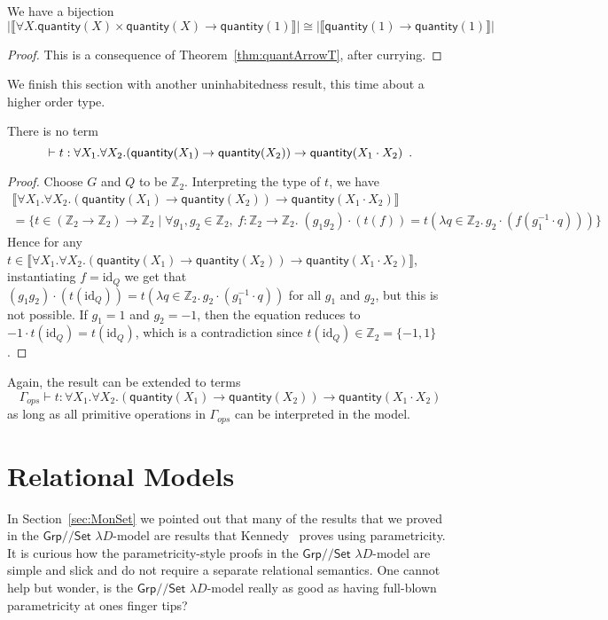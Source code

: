 \documentclass[a4paper,UKenglish]{lipics}
\theoremstyle{plain}
\newcommand{\msf}[1]{\mathsf{#1}} %
\newcommand{\Grp}{\msf{Grp}}
\newcommand{\Set}{\msf{Set}}
\newcommand{\Lslice}[1]{#1/\!/\Set}
\newcommand{\GrpSet}{\Lslice{\Grp}}
\newcommand{\bbZ}{\mathbb{Z}}
\newcommand{\sem}[1]{\ensuremath{\llbracket #1 \rrbracket}}
\newcommand{\qnt}{\msf{quantity}}
\newcommand{\Gammaops}{\ensuremath{\Gamma_{ops}}}
\newcommand{\id}{\mathrm{id}}
\begin{document}
\begin{theorem}We have a bijection
 \label{thm:AppSubs}
 \[
 |\sem{\forall X . \qnt(X) \times \qnt(X) \rightarrow \qnt(1)}| \cong |\sem{\qnt(1)\rightarrow \qnt(1)}|
 \]
\end{theorem}
\begin{proof}
This is a consequence of Theorem~\ref{thm:quantArrowT}, after currying.
\end{proof}

We finish this section with another uninhabitedness result, this time
about a higher order type.

\begin{theorem}\label{thm:UninhabInt}
There is no term
\[
\vdash t : \forall X_1. \forall X_2. (\qnt(X_1) \rightarrow \qnt(X_2)) \rightarrow \qnt(X_1 \cdot X_2)\enspace \text.
\]
\end{theorem}
\begin{proof}
Choose $G$ and $Q$ to be $\bbZ_2$. Interpreting the type of $t$, we have
 \begin{multline*}
\sem{\forall X_1. \forall X_2. (\qnt(X_1) \rightarrow \qnt(X_2)) \rightarrow \qnt(X_1 \cdot X_2)} \\=
\{ t \in (\bbZ_2 {\rightarrow} \bbZ_2) {\rightarrow} \bbZ_2 \; | \; \forall g_1,  g_2 \in \bbZ_2,\ f:\bbZ_2{\to} \bbZ_2. \; (g_1 g_2) \cdot (t(f))=
t(\lambda q\in \bbZ_2.\,g_2\cdot (f(g_1^{-1}\cdot q))) \}
 \end{multline*}
Hence for any $t \in  \sem{\forall X_1. \forall X_2. (\qnt(X_1) \rightarrow \qnt(X_2)) \rightarrow \qnt(X_1 \cdot X_2)}$, instantiating $f=\id_Q$ we get that $(g_1 g_2) \cdot (t(\id_Q)) = t(\lambda q\in \bbZ_2.\,g_2\cdot (g_1^{-1}\cdot q))$ for all $g_1$ and $g_2$, but this is not possible. If $g_1 = 1$ and $g_2 = -1$, then the equation reduces to $-1\cdot t(\id_Q)=t(\id_Q)$, which is a contradiction since $t(\id_Q) \in \bbZ_2 = \{-1, 1\}$.
\end{proof}
Again, the result can be extended to terms
\[
\Gammaops \vdash t : \forall X_1. \forall X_2. (\qnt(X_1) \rightarrow \qnt(X_2)) \rightarrow \qnt(X_1 \cdot X_2)
\]
as long as all primitive operations in $\Gammaops$ can be interpreted
in the model.










\section{Relational Models}
\label{sec:param}
In Section~\ref{sec:MonSet} we pointed out that many of the results that we proved in the $\GrpSet$ $\lambda D$-model are results that  Kennedy~\cite{Kennedy:1997:RPU:263699.263761} proves using parametricity. It is curious how the parametricity-style proofs in the $\GrpSet$ $\lambda D$-model are simple and slick and do not require a separate relational semantics. One cannot help but wonder, is the $\GrpSet$ $\lambda D$-model really as good as having full-blown parametricity at ones finger tips?
\end{document}
